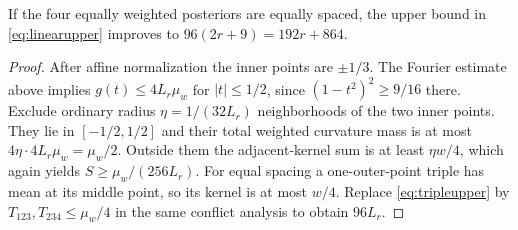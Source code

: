 \begin{corollary}
\label{cor:equalspacing}
If the four equally weighted posteriors are equally spaced, the upper bound in \eqref{eq:linearupper} improves to $96(2r+9)=192r+864$.
\end{corollary}
\begin{proof}
After affine normalization the inner points are $\pm1/3$. The Fourier estimate above implies $g(t)\le4L_r\mu_w$ for $|t|\le1/2$, since $(1-t^2)^2\ge9/16$ there. Exclude ordinary radius $\eta=1/(32L_r)$ neighborhoods of the two inner points. They lie in $[-1/2,1/2]$ and their total weighted curvature mass is at most $4\eta\cdot4L_r\mu_w=\mu_w/2$. Outside them the adjacent-kernel sum is at least $\eta w/4$, which again yields $S\ge\mu_w/(256L_r)$. For equal spacing a one-outer-point triple has mean at its middle point, so its kernel is at most $w/4$. Replace \eqref{eq:tripleupper} by $T_{123},T_{234}\le\mu_w/4$ in the same conflict analysis to obtain $96L_r$.
\end{proof}
